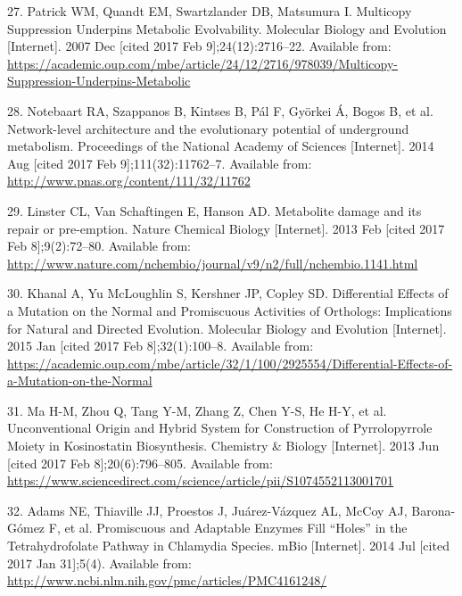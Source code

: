 \documentclass[12pt,twoside]{reedthesis}
\begin{document}
{  \hypertarget{ref-patrick_multicopy_2007}{}
  27. Patrick WM, Quandt EM, Swartzlander DB, Matsumura I. Multicopy
  Suppression Underpins Metabolic Evolvability. Molecular Biology and
  Evolution {[}Internet{]}. 2007 Dec {[}cited 2017 Feb
  9{]};24(12):2716--22. Available from:
  \url{https://academic.oup.com/mbe/article/24/12/2716/978039/Multicopy-Suppression-Underpins-Metabolic}
  
  \hypertarget{ref-notebaart_network-level_2014}{}
  28. Notebaart RA, Szappanos B, Kintses B, Pál F, Györkei Á, Bogos B, et
  al. Network-level architecture and the evolutionary potential of
  underground metabolism. Proceedings of the National Academy of Sciences
  {[}Internet{]}. 2014 Aug {[}cited 2017 Feb 9{]};111(32):11762--7.
  Available from: \url{http://www.pnas.org/content/111/32/11762}
  
  \hypertarget{ref-linster_metabolite_2013}{}
  29. Linster CL, Van Schaftingen E, Hanson AD. Metabolite damage and its
  repair or pre-emption. Nature Chemical Biology {[}Internet{]}. 2013 Feb
  {[}cited 2017 Feb 8{]};9(2):72--80. Available from:
  \url{http://www.nature.com/nchembio/journal/v9/n2/full/nchembio.1141.html}
  
  \hypertarget{ref-khanal_differential_2015}{}
  30. Khanal A, Yu McLoughlin S, Kershner JP, Copley SD. Differential
  Effects of a Mutation on the Normal and Promiscuous Activities of
  Orthologs: Implications for Natural and Directed Evolution. Molecular
  Biology and Evolution {[}Internet{]}. 2015 Jan {[}cited 2017 Feb
  8{]};32(1):100--8. Available from:
  \url{https://academic.oup.com/mbe/article/32/1/100/2925554/Differential-Effects-of-a-Mutation-on-the-Normal}
  
  \hypertarget{ref-ma_unconventional_2013}{}
  31. Ma H-M, Zhou Q, Tang Y-M, Zhang Z, Chen Y-S, He H-Y, et al.
  Unconventional Origin and Hybrid System for Construction of
  Pyrrolopyrrole Moiety in Kosinostatin Biosynthesis. Chemistry \& Biology
  {[}Internet{]}. 2013 Jun {[}cited 2017 Feb 8{]};20(6):796--805.
  Available from:
  \url{https://www.sciencedirect.com/science/article/pii/S1074552113001701}
  
  \hypertarget{ref-adams_promiscuous_2014}{}
  32. Adams NE, Thiaville JJ, Proestos J, Juárez-Vázquez AL, McCoy AJ,
  Barona-Gómez F, et al. Promiscuous and Adaptable Enzymes Fill ``Holes''
  in the Tetrahydrofolate Pathway in Chlamydia Species. mBio
  {[}Internet{]}. 2014 Jul {[}cited 2017 Jan 31{]};5(4). Available from:
  \url{http://www.ncbi.nlm.nih.gov/pmc/articles/PMC4161248/}
  
}
\end{document}
